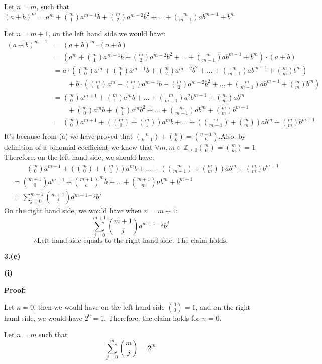 \documentclass[a4paper,12pt]{report}
\begin{document}
\noindent
Let $n=m$, such that $(a+b)^m=a^m+\binom m1a^{m-1}b+\binom m2a^{m-2}b^2+\dots+\binom m{m-1}ab^{m-1}+b^m$ 

\noindent
Let $n=m+1$, on the left hand side we would have:
\begin{align*}
(a+b)^{m+1}
&=(a+b)^m\cdot{(a+b)}\\
&=(a^m+\binom m1a^{m-1}b+\binom m2a^{m-2}b^2+\dots+\binom m{m-1}ab^{m-1}+b^m)\cdot{(a+b)}\\
&=a\cdot{\left(\binom m0 a^m+\binom m1a^{m-1}b+\binom m2a^{m-2}b^2+\dots+\binom m{m-1}ab^{m-1}+\binom mm b^m\right)}\\
&\qquad+b\cdot{\left(\binom m0 a^m+\binom m1a^{m-1}b+\binom m2a^{m-2}b^2+\dots+\binom m{m-1}ab^{m-1}+\binom mm b^m\right)}\\
&=\binom m0 a^{m+1}+\binom m1a^mb+\dots+\binom m{m-1} a^2b^{m-1} + \binom mm ab^m\\
&\qquad+\binom m0 a^mb +\binom m1 a^mb^2+\dots+\binom m{m-1} ab^m+\binom mm b^{m+1}\\
&=\binom m0 a^{m+1}+\left(\binom m0+\binom m1\right)a^mb+\dots+\left(\binom m{m-1}+\binom mm\right)ab^m+\binom mm b^{m+1}\\
\end{align*}
It's because from (a) we have proved that \(\binom n{k-1}+\binom nk=\binom {n+1}k\).Also, by definition of a binomial coefficient we know that \(\forall m, m\in \mathbb{Z}_{\geq0} \binom m0=\binom mm=1\) Therefore, on the left hand side, we should have:
\begin{align*}
&\qquad\binom m0 a^{m+1}+\left(\binom m0+\binom m1\right)a^mb+\dots+\left(\binom m{m-1}+\binom mm\right)ab^m+\binom mm b^{m+1}\\
&=\binom {m+1}0 a^{m+1}+\binom {m+1} a^mb+\dots+\binom {m+1}m ab^m+b^{m+1}\\
&=\sum_{j=0}^{m+1} \binom {m+1}j a^{m+1-j}b^j
\end{align*}
On the right hand side, we would have when $n=m+1$:$$\sum_{j=0}^{m+1} \binom {m+1}j a^{m+1-j}b^j$$
\[\therefore \text{Left hand side equals to the right hand side. The claim holds.}\]

\noindent
\textbf{3.(e)}

\textbf{(i)}

\noindent
\textbf{Proof:}

\noindent
Let $n=0$, then we would have on the left hand side \(\binom 00=1\), and on the right hand side, we would have $2^0=1$. Therefore, the claim holds for $n=0$. 

\noindent
Let $n=m$ such that $$\sum_{j=0}^{m} \binom {m}j=2^m$$
\end{document}
